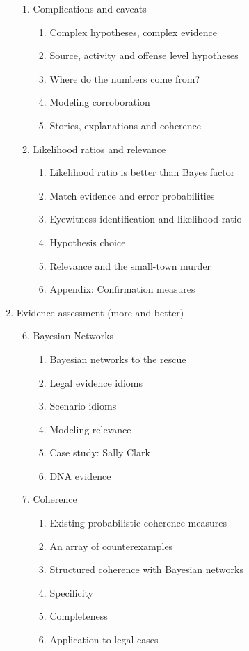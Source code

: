 \documentclass[
  10pt,
  dvipsnames,enabledeprecatedfontcommands]{scrartcl}
\begin{document}
\begin{multicols}{2}
\begin{enumerate}
\begin{enumerate}
  
  
  \item  Complications and caveats
  \begin{enumerate}
  \item  Complex hypotheses, complex evidence
  \item  Source, activity and offense level hypotheses
  \item  Where do the numbers come from?
  \item  Modeling corroboration
  \item  Stories, explanations and coherence
  \end{enumerate}

  
  \item  Likelihood ratios and relevance
  \begin{enumerate}
  \item Likelihood ratio is better than Bayes factor
  \item Match evidence and error probabilities
  \item Eyewitness identification and likelihood ratio
  \item Hypothesis choice
  \item Relevance and the small-town murder 
  \item Appendix: Confirmation measures
   \end{enumerate}


\end{enumerate}
\item  Evidence assessment (more and better)
\begin{enumerate}

\setcounter{enumii}{5}
\item  Bayesian Networks

  \begin{enumerate}
  \item  Bayesian networks to the rescue
  \item  Legal evidence idioms
  \item Scenario idioms
  \item Modeling relevance
  \item  Case study: Sally Clark
  \item DNA evidence
  \end{enumerate}
  
   \item Coherence
  \begin{enumerate}
  \item Existing probabilistic coherence measures
  \item An array of counterexamples
  \item Structured coherence with Bayesian networks
  \item Specificity
  \item Completeness 
  \item Application to legal cases
  \end{enumerate}
  

\end{enumerate}
\end{enumerate}
\end{multicols}
\end{document}
